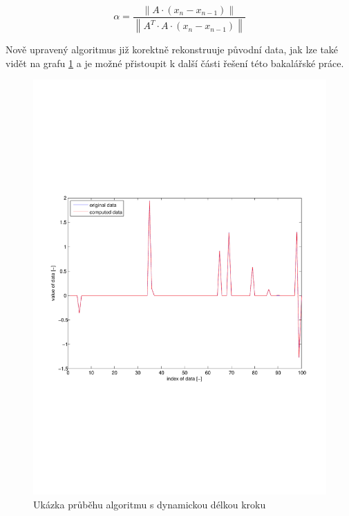 \documentclass[FM,BP]{tulthesis}
\newcounter{Vzorce}
\begin{document}
\begin{equation} \label{eq:ComputeAlpha}  \tag{Vzorec \theVzorce}
\alpha = \frac{\left\| A \cdot (x_{n} - x_{n-1}) \right\|}{\left\| A^{T} \cdot A \cdot (x_{n} - x_{n-1}) \right\| }
\end{equation}

Nově upravený algoritmus již korektně rekonstruuje původní data, jak lze také vidět na grafu \ref{fig:dynamicAlpha} a je možné přistoupit k další části řešení této bakalářské práce.

\begin{figure}[!ht]
\begin{center}
\includegraphics[scale=0.7]{obr/dynamic.pdf}
\end{center}
\caption{Ukázka průběhu algoritmu s dynamickou délkou kroku}
\label{fig:dynamicAlpha}
\end{figure}
\end{document}
